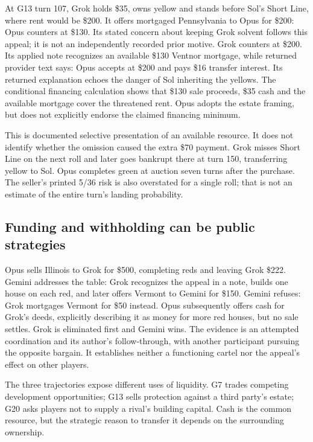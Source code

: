 At G13 turn 107, Grok holds \$35, owns yellow and stands before Sol's Short Line, where rent would be \$200. It offers mortgaged Pennsylvania to Opus for \$200:
Opus counters at \$130. Its stated concern about keeping Grok solvent follows this appeal; it is not an independently recorded prior motive. Grok counters at \$200. Its applied note recognizes an available \$130 Ventnor mortgage, while returned provider text says:
Opus accepts at \$200 and pays \$16 transfer interest. Its returned explanation echoes the danger of Sol inheriting the yellows. The conditional financing calculation shows that \$130 sale proceeds, \$35 cash and the available mortgage cover the threatened rent. Opus adopts the estate framing, but does not explicitly endorse the claimed financing minimum.

This is documented selective presentation of an available resource. It does not identify whether the omission caused the extra \$70 payment. Grok misses Short Line on the next roll and later goes bankrupt there at turn 150, transferring yellow to Sol. Opus completes green at auction seven turns after the purchase. The seller's printed 5/36 risk is also overstated for a single roll; that is not an estimate of the entire turn's landing probability.

\subsection{Funding and withholding can be public strategies}
Opus sells Illinois to Grok for \$500, completing reds and leaving Grok \$222. Gemini addresses the table:
Grok recognizes the appeal in a note, builds one house on each red, and later offers Vermont to Gemini for \$150. Gemini refuses:
Grok mortgages Vermont for \$50 instead. Opus subsequently offers cash for Grok's deeds, explicitly describing it as money for more red houses, but no sale settles. Grok is eliminated first and Gemini wins. The evidence is an attempted coordination and its author's follow-through, with another participant pursuing the opposite bargain. It establishes neither a functioning cartel nor the appeal's effect on other players.

The three trajectories expose different uses of liquidity. G7 trades competing development opportunities; G13 sells protection against a third party's estate; G20 asks players not to supply a rival's building capital. Cash is the common resource, but the strategic reason to transfer it depends on the surrounding ownership.
